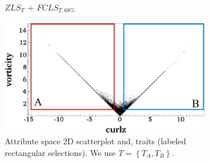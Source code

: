\begin{figure}[h]
\begin{subfigure}{0.24\linewidth}
\caption{$ZLS_{T}$ + $FCLS_{T,68\%}$}
\label{}
\end{subfigure}
\begin{subfigure}{0.24\linewidth}
\centering
\includegraphics[width=0.95\linewidth]{Images/RedSeaEddy/scatterplot.pdf}
\caption{Attribute space 2D scatterplot and, traits (labeled rectangular selections). We use $T = \left\{T_{A}, T_{B}\right\}$.} 
\label{}
\end{subfigure}
\caption{}
\label{}
\end{figure}
